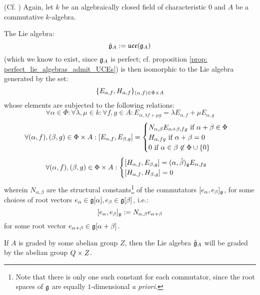         \begin{theorem} \label{theorem: chevalley_serre_presentations_for_UCEs}
            (Cf. \cite[Definition 3.1 and Corollary 3.4]{kassel_universal_central_extensions_of_lie_algebras}) Again, let $k$ be an algebraically closed field of characteristic $0$ and $A$ be a commutative $k$-algebra. 

            The Lie algebra:
                $$\tilde{\mathfrak{g}}_A := \mathfrak{uce}(\mathfrak{g}_A)$$
            (which we know to exist, since $\mathfrak{g}_A$ is perfect; cf. proposition \ref{prop: perfect_lie_algebras_admit_UCEs}) is then isomorphic to the Lie algebra generated by the set:
                $$\{ E_{\alpha, f}, H_{\alpha, f} \}_{(\alpha, f) \in \Phi \x A}$$
            whose elements are subjected to the following relations:
                $$\forall \alpha \in \Phi: \forall \lambda, \mu \in k: \forall f, g \in A: E_{\alpha, \lambda f + \mu g} = \lambda E_{\alpha, f} + \mu E_{\alpha, g}$$
                $$
                    \forall (\alpha, f), (\beta, g) \in \Phi \x A: [E_{\alpha, f}, E_{\beta, g}] =
                    \begin{cases}
                        \text{$N_{\alpha, \beta} E_{\alpha + \beta, fg}$ if $\alpha + \beta \in \Phi$}
                        \\
                        \text{$H_{\alpha, fg}$ if $\alpha + \beta = 0$}
                        \\
                        \text{$0$ if $\alpha \in \beta \not \in \Phi \cup \{0\}$}
                    \end{cases}
                $$
                $$
                    \forall (\alpha, f), (\beta, g) \in \Phi \x A:
                    \begin{cases}
                        [H_{\alpha, f}, E_{\beta, g}] = (\alpha, \check{\beta})_{\g} E_{\alpha, fg}
                        \\
                        [H_{\alpha, f}, H_{\beta, g}] = 0
                    \end{cases}    
                $$
            wherein $N_{\alpha, \beta}$ are the structural constants\footnote{Note that there is only one such constant for each commutator, since the root spaces of $\mathfrak{g}$ are equally $1$-dimensional \textit{a priori}.} of the commutators $[e_{\alpha}, e_{\beta}]_{\mathfrak{g}}$, for some choices of root vectors $e_{\alpha} \in \mathfrak{g}[\alpha], e_{\beta} \in \mathfrak{g}[\beta]$, i.e.:
                $$[e_{\alpha}, e_{\beta}]_{\mathfrak{g}} := N_{\alpha, \beta} e_{\alpha + \beta}$$
            for some root vector $e_{\alpha + \beta} \in \mathfrak{g}[\alpha + \beta]$.
        \end{theorem}
        \begin{corollary}
            If $A$ is graded by some abelian group $Z$, then the Lie algebra $\tilde{\mathfrak{g}}_A$ will be graded by the abelian group $Q \x Z$. 
        \end{corollary}

